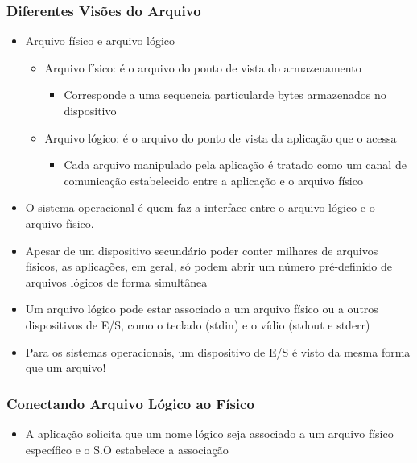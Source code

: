 \documentclass[12pt]{article}
\begin{document}
        \subsubsection{Diferentes Visões do Arquivo}
        \begin{itemize}
            \item Arquivo físico e arquivo lógico
            \begin{itemize}
                \item Arquivo físico: é o arquivo do ponto de vista do 
                armazenamento
                \begin{itemize}
                    \item Corresponde a uma sequencia particularde bytes 
                    armazenados no dispositivo
                \end{itemize}
                \item Arquivo lógico: é o arquivo do ponto de vista da aplicação 
                que o acessa
                \begin{itemize}
                    \item Cada arquivo manipulado pela aplicação é tratado como 
                    um canal de comunicação estabelecido entre a aplicação e o 
                    arquivo físico
                \end{itemize}
            \end{itemize}
            \item O sistema operacional é quem faz a interface entre o arquivo 
            lógico e o arquivo físico.
            \item Apesar de um dispositivo secundário poder conter milhares de 
            arquivos físicos, as aplicações, em geral, só podem abrir um número 
            pré-definido de arquivos lógicos de forma simultânea
            \item Um arquivo lógico pode estar associado a um arquivo físico ou 
            a outros dispositivos de E/S, como o teclado (stdin) e o vídio 
            (stdout e stderr)
            \item Para os sistemas operacionais, um dispositivo de E/S é 
            visto da mesma forma que um arquivo!
        \end{itemize}
        \subsubsection{Conectando Arquivo Lógico ao Físico}
        \begin{itemize}
            \item A aplicação solicita que um nome lógico seja associado a um 
            arquivo físico específico e o S.O estabelece a associação


        \end{itemize}
\end{document}
